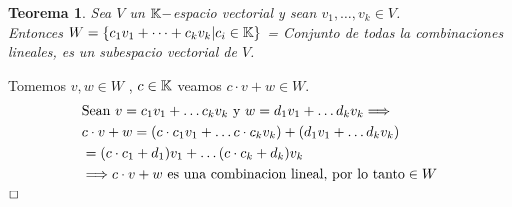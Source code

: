 \documentclass[]{article}
\newtheorem{theorem}{Teorema}
\newenvironment{proof}{\noindent{\bf Prueba:}}{$\hfill \Box$ \vspace{10pt}}
\begin{document}
\begin{theorem}
    Sea $V$ un $\mathbb{K}-$espacio vectorial y sean $v_1, \dots , v_k \in V$.\\
    Entonces $W=\{ c_1v_1+ \dots + c_kv_k | c_i \in \mathbb{K}\}$ = Conjunto de todas la combinaciones lineales,
    es un subespacio vectorial de $V$.
\end{theorem}
\begin{proof}
    Tomemos $v,w \in W$ , $c \in \mathbb{K}$ veamos $c \cdot v + w \in W$.
    \begin{align*}
        &\text{Sean } v= c_1v_1+ \dots c_kv_k \text{ y } w = d_1v_1 + \dots d_kv_k \Longrightarrow \\
        &c \cdot v + w = (c \cdot c_1v_1+ \dots c \cdot c_kv_k) + (d_1v_1 + \dots d_kv_k)\\
        &= (c \cdot c_1 + d_1)v_1 + \dots (c \cdot c_k + d_k)v_k \\
        &\Longrightarrow c \cdot v + w \text{ es una combinacion lineal, por lo tanto} \in W
    \end{align*}
\end{proof}
\end{document}

